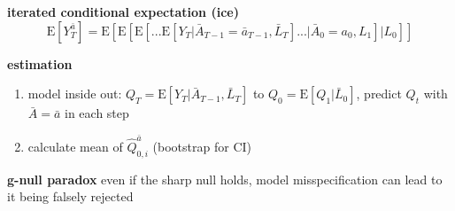 \documentclass[8pt,twoside]{extarticle}
\begin{document}
\begin{multicols}{2}
{\begin{minipage}{28em}
\begin{mdframed}
\end{mdframed}





\textbf{iterated conditional expectation (ice)} 
$$\mathrm{E}\left[ Y_T^{\bar{a}}\right] = \mathrm{E} \left[ \mathrm{E} \left[\mathrm{E} \left[ ... \mathrm{E} \left[Y_T| \bar{A}_{T{-}1} {=} \bar{a}_{T{-}1}, \bar{L}_T \right]  ...|\bar{A}_0 {=} a_0, L_1 \right] |L_0 \right]\right]$$



\begin{mdframed}[linecolor=black!20!,
    outerlinewidth=0.2pt,
    innertopmargin=0.5\baselineskip,
    innerbottommargin=0.5\baselineskip,
    backgroundcolor=lightgray!20!white, innerleftmargin=2pt, innerrightmargin=2pt]
\textbf{estimation} \citep{schomaker_using_2019}

\begin{enumerate}[itemsep=0em, topsep=0pt, partopsep=0pt,parsep=0pt, leftmargin=1.5em]
\setlength{\itemsep}{0pt}%
\setlength{\parskip}{0pt}
\item model inside out: $Q_{T} {=} \mathrm{E} \left[Y_T| \bar{A}_{T{-}1}, \bar{L}_T \right]$ to $Q_0 {=} \mathrm{E} \left[Q_1| \bar{L}_0 \right]$, predict $Q_t$ with $\bar{A} = \bar{a}$ in each step
\item calculate mean of $\hat{Q}_{0,i}^{\bar{a}}$ (bootstrap for CI)
\end{enumerate}



\end{mdframed}

 \textbf{g-null paradox} even if the sharp null holds, model misspecification can lead to it being falsely rejected

\end{minipage}}




\end{multicols}
\end{document}
